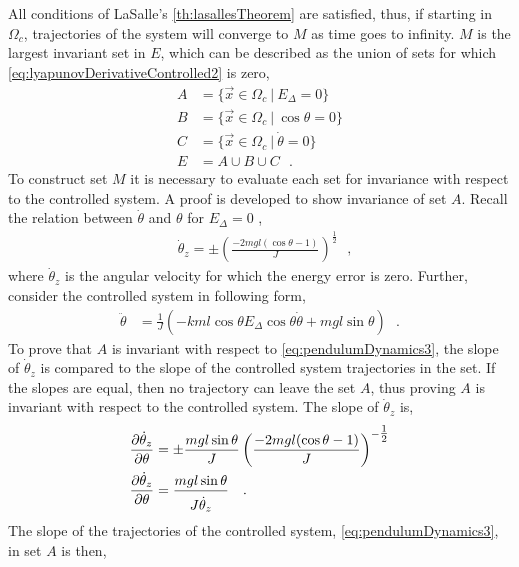 All conditions of LaSalle's \autoref{th:lasallesTheorem} are satisfied, thus, if starting in $\Omega_c$, trajectories of the system will converge to $M$ as time goes to infinity. $M$ is the largest invariant set in $E$, which can be described as the union of sets for which \autoref{eq:lyapunovDerivativeControlled2} is zero,
\begin{align}
  A &=  \{ \vec{x} \in \Omega_c \ | \ E_\Delta     = 0 \}      \\
  B &=  \{ \vec{x} \in \Omega_c \ | \ \cos \theta  = 0 \}  \\
  C &=  \{ \vec{x} \in \Omega_c \ | \ \dot{\theta} = 0 \}  \\
  E &= A \cup B \cup C \ \ \ . \label{eq:E}
\end{align}
To construct set $M$ it is necessary to evaluate each set for invariance with respect to the controlled system. A proof is developed to show invariance of set $A$.
Recall the relation between $\dot{\theta}$ and $\theta$ for $E_\Delta = 0$ ,
\begin{align}
  &\dot{\theta}_z = \pm \left(\frac{-2 m g l (\cos \theta -1)}{J}\right)^{\tfrac{1}{2}}  \ \ \ ,  \label{eq:thetaDotForEDeltaZero}
\end{align}
where $\dot{\theta}_z$ is the angular velocity for which the energy error is zero. Further, consider the controlled system in following form,
\begin{align}
  \ddot{\theta} &= \tfrac{1}{J} ( -k m l \cos \theta E_\Delta \cos \theta \dot{\theta} + m g l \sin \theta ) \ \ \ .  \label{eq:pendulumDynamics3}
\end{align}
To prove that $A$ is invariant with respect to \autoref{eq:pendulumDynamics3}, the slope of $\dot{\theta}_z$ is compared to the slope of the controlled system trajectories in the set. If the slopes are equal, then no trajectory can leave the set $A$, thus proving $A$ is invariant with respect to the controlled system. The slope of $\dot{\theta}_z$ is,
\begin{align}
  \frac{\partial \dot{\theta}_z}{\partial \theta} &= \pm \frac{m g l \sin\theta}{ J } \left(\frac{-2 m g l (\cos \theta -1)}{J}\right)^{-\tfrac{1}{2}} \\
  \frac{\partial \dot{\theta}_z}{\partial \theta} &= \frac{m g l \sin\theta}{ J \rule{0pt}{12pt}\dot{\theta}_z}  \ \ \ .  \label{eq:thetaDotForEDeltaZero_dTheta}
\end{align}
The slope of the trajectories of the controlled system, \autoref{eq:pendulumDynamics3}, in set $A$ is then,
